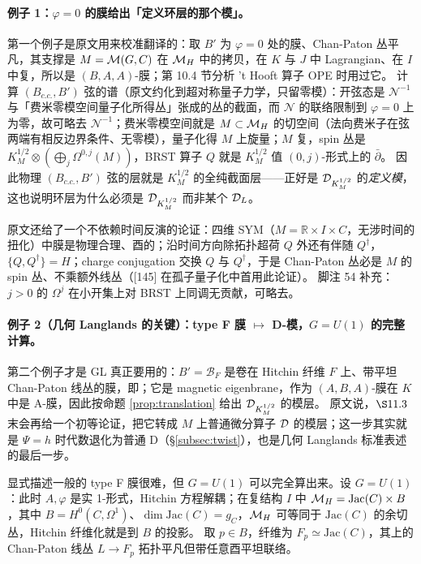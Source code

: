 \paragraph{例子 1：\(\varphi=0\) 的膜给出「定义环层的那个模」。}第一个例子是原文用来校准翻译的：取 \(B'\) 为 \(\varphi=0\) 处的膜、Chan-Paton 丛平凡，其支撑是 \(M=\mathcal{M}(G,C)\) 在 \(\mathcal{M}_H\) 中的拷贝，在 \(K\) 与 \(J\) 中 Lagrangian、在 \(I\) 中复，所以是 \((B,A,A)\)-膜；第 10.4 节分析 't Hooft 算子 OPE 时用过它。\pA{} 计算 \((B_{c.c.},B')\) 弦的谱（原文约化到超对称量子力学，只留零模）：开弦态是 \(\mathcal N^{-1}\) 与「费米零模空间量子化所得丛」张成的丛的截面，而 \(\mathcal N\) 的联络限制到 \(\varphi=0\) 上为零，故可略去 \(\mathcal N^{-1}\)；费米零模空间就是 \(M\subset\mathcal{M}_H\) 的切空间（法向费米子在弦两端有相反边界条件、无零模），量子化得 \(M\) 上旋量；\(M\) 复，spin 丛是 \(K_M^{1/2}\otimes(\bigoplus_j\Omega^{0,j}(M))\)，BRST 算子 \(Q\) 就是 \(K_M^{1/2}\) 值 \((0,j)\)-形式上的 \(\bar\partial\)。\pA{} 因此物理 \((B_{c.c.},B')\) 弦的层就是 \(K_M^{1/2}\) 的全纯截面层——正好是 \(\mathcal{D}_{K_M^{1/2}}\) 的\emph{定义模}，这也说明环层为什么必须是 \(\mathcal{D}_{K_M^{1/2}}\) 而非某个 \(\mathcal{D}_L\)。\pA{}

原文还给了一个不依赖时间反演的论证：四维 SYM（\(M=\mathbb R\times I\times C\)，无涉时间的扭化）中膜是物理合理、酉的；沿时间方向除拓扑超荷 \(Q\) 外还有伴随 \(Q^\dagger\)，\(\{Q,Q^\dagger\}=H\)；charge conjugation 交换 \(Q\) 与 \(Q^\dagger\)，于是 Chan-Paton 丛必是 \(M\) 的 spin 丛、不乘额外线丛（[145] 在孤子量子化中首用此论证）。\pA{} 脚注 54 补充：\(j>0\) 的 \(\Omega^j\) 在小开集上对 BRST 上同调无贡献，可略去。

\paragraph{例子 2（几何 Langlands 的关键）：type F 膜 \(\mapsto\) D-模，\(G=U(1)\) 的完整计算。}第二个例子才是 GL 真正要用的：\(B'=\mathcal B_F\) 是卷在 Hitchin 纤维 \(F\) 上、带平坦 Chan-Paton 线丛的膜，即；它是 magnetic eigenbrane，作为 \((A,B,A)\)-膜在 \(K\) 中是 A-膜，因此按命题 \ref{prop:translation} 给出 \(\mathcal{D}_{K_M^{1/2}}\) 的模层。\pA{} 原文说，\(\S11.3\) 末会再给一个初等论证，把它转成 \(M\) 上普通微分算子 \(\mathcal{D}\) 的模层；这一步其实就是 \(\Psi=h\) 时代数退化为普通 D（\S\ref{subsec:twist}），也是几何 Langlands 标准表述的最后一步。\pA{}

显式描述一般的 type F 膜很难，但 \(G=U(1)\) 可以完全算出来。设 \(G=U(1)\)：此时 \(A,\varphi\) 是实 1-形式，Hitchin 方程解耦；在复结构 \(I\) 中 \(\mathcal{M}_H=\mathrm{Jac}(C)\times B\)，其中 \(B=H^0(C,\Omega^1)\)、\(\dim\mathrm{Jac}(C)=g_C\)，\(\mathcal{M}_H\) 可等同于 \(\mathrm{Jac}(C)\) 的余切丛，Hitchin 纤维化就是到 \(B\) 的投影。\pA{} 取 \(p\in B\)，纤维为 \(F_p\simeq\mathrm{Jac}(C)\)，其上的 Chan-Paton 线丛 \(L\to F_p\) 拓扑平凡但带任意酉平坦联络。\pA{}

